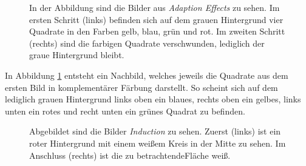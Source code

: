 \documentclass[11pt]{article}
\begin{document}
\begin{figure}[H]
\caption{In der Abbildung sind die Bilder aus \textit{Adaption Effects} zu sehen. Im ersten Schritt (links) befinden sich auf dem grauen Hintergrund vier Quadrate in den Farben gelb, blau, grün und rot. Im zweiten Schritt (rechts) sind die farbigen Quadrate verschwunden, lediglich der graue Hintergrund bleibt.}
\label{4farben}
\end{figure}

In Abbildung \ref{4farben} entsteht ein Nachbild, welches jeweils die Quadrate aus dem ersten Bild in komplementärer Färbung darstellt. So scheint sich auf dem lediglich grauen Hintergrund links oben ein blaues, rechts oben ein gelbes, links unten ein rotes und recht unten ein grünes Quadrat zu befinden. 

\begin{figure}[H]
\caption{Abgebildet sind die Bilder \textit{Induction} zu sehen. Zuerst (links) ist ein roter Hintergrund mit einem weißem Kreis in der Mitte zu sehen. Im Anschluss (rechts) ist die zu betrachtendeFläche weiß.}
\label{induction}
\end{figure}
\end{document}
